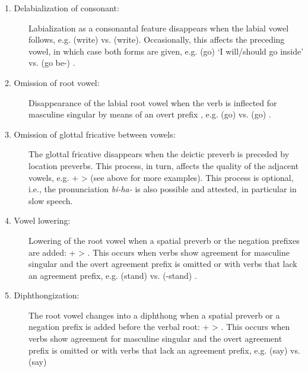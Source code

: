 \begin{description}
\item[1. Delabialization of consonant:] Labialization as a consonantal feature disappears when the labial vowel  follows, e.g.  (write) vs.  (write). Occasionally, this affects the preceding vowel, in which case both forms are given, e.g.  (go) `I will\slash should go inside' vs.  (go be-) .

\item[2. Omission of root vowel:] Disappearance of the labial root vowel when the verb is inflected for masculine singular by means of an overt prefix , e.g.  (go)  vs.  (go) .

\item[3. Omission of glottal fricative between vowels:] The glottal fricative disappears when the deictic preverb  is preceded by location preverbs. This process, in turn, affects the quality of the adjacent vowels, e.g.  +  >  (see  above for more examples). This process is optional, i.e., the pronunciation \textit{bi-ha-} is also possible and attested, in particular in slow speech.

\item[4. Vowel lowering:] Lowering of the root vowel  when a spatial preverb  or the negation prefixes  are added:  +  > . This occurs when verbs show agreement for masculine singular and the overt agreement prefix is omitted or with verbs that lack an agreement prefix, e.g.  (stand)  vs.  (-stand) .

\item[5. Diphthongization:] The root vowel  changes into a diphthong when a spatial preverb  or a negation prefix  is added before the verbal root:  +  > . This occurs when verbs show agreement for masculine singular and the overt agreement prefix is omitted or with verbs that lack an agreement prefix, e.g.  (say)  vs.  (say) 


\end{description}
